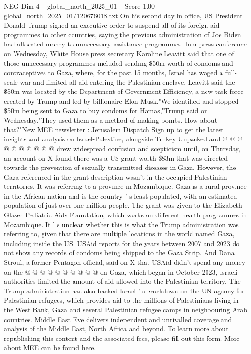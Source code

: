\begin{textsample}{NEG Dim 4 – global\_north\_2025\_01 – Score 1.00 – global\_north\_2025\_01/120676018.txt}  \label{ex:f4_neg_413}
On his second day in office, US President Donald Trump signed an executive order to suspend all of its foreign aid programmes to other countries, saying the previous administration of Joe Biden had allocated money to unnecessary assistance programmes.
In a press conference on Wednesday, White House press secretary Karoline Leavitt said that one of those unnecessary programmes included sending \$50m worth of condoms and contraceptives to Gaza, where, for the past 15 months, Israel has waged a full-scale war and limited all aid entering the Palestinian enclave.
Leavitt said the \$50m was located by the Department of Government Efficiency, a new task force created by Trump and led by billionaire Elon Musk."We identified and stopped \$50m being sent to Gaza to buy condoms for Hamas,"Trump said on Wednesday."They used them as a method of making bombs.
How about that?"New MEE newsletter : Jerusalem Dispatch Sign up to get the latest insights and analysis on Israel-Palestine, alongside Turkey Unpacked and @ @ @ @ @ @ @ @ @ @ drew widespread confusion and scepticism until, on Thursday, an account on X found there was a US grant worth \$83m that was directed towards the prevention of sexually transmitted diseases in Gaza.
However, the Gaza referenced in the grant description wasn't in the occupied Palestinian territories.
It was referring to a province in Mozambique.
Gaza is a rural province in the African nation and is the country ' s least populated, with an estimated population of just over one million people.
The grant was given to the Elizabeth Glaser Pediatric Aids Foundation, which works on different health programmes in Mozambique.
It ' s unclear whether this is what the Trump administration was referring to, given that there are multiple locations in the world named Gaza, including inside the US.
USAid reports for the years between 2007 and 2023 do not show any records of condoms being shipped to the Gaza Strip.
And Dana Stroul, a former Pentagon official, said on X that USAid didn't spend any money on the @ @ @ @ @ @ @ @ @ @ on Gaza, which began in October 2023, Israeli authorities limited the amount of aid allowed into the Palestinian territory.
The Trump administration has also backed Israel ' s crackdown on the UN agency for Palestinian refugees, which provides aid to the millions of Palestinians living in the West Bank, Gaza and several Palestinian refugee camps in neighbouring Arab countries.
Middle East Eye delivers independent and unrivalled coverage and analysis of the Middle East, North Africa and beyond.
To learn more about republishing this content and the associated fees, please fill out this form.
More about MEE can be found here.

\end{textsample}
